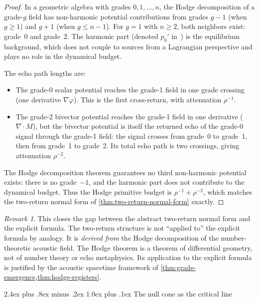 \documentclass[11pt,a4paper]{article}
\makeatletter
\theoremstyle{plain}
\theoremstyle{definition}
\theoremstyle{remark}
\newtheorem{remark}[theorem]{Remark}
\numberwithin{equation}{section}
\renewcommand{\subsection}{%
  \@startsection{subsection}{2}{0pt}%
    {2.4ex plus .8ex minus .2ex}%
    {1.0ex plus .1ex}%
    {\normalfont\Large\bfseries\color{headingAccent}}%
}
\makeatother
\begin{document}
\begin{proof}
In a geometric algebra with grades \(0,1,\ldots,n\), the Hodge
decomposition of a grade-\(g\) field has non-harmonic potential
contributions from grades \(g-1\) (when \(g\ge1\)) and \(g+1\) (when
\(g\le n-1\)).  For \(g=1\) with \(n\ge2\), both neighbors exist:
grade~0 and grade~2.  The harmonic part
(denoted \(p_0'\) in~\cite{burns2024}) is the equilibrium background, which does not
couple to sources from a Lagrangian perspective and
plays no role in the dynamical budget.

The echo path lengths are:
\begin{itemize}
  \item The grade-0 scalar potential reaches the grade-1 field in one
    grade crossing (one derivative \(\nabla\varphi\)).  This is the
    first cross-return, with attenuation \(\rho^{-1}\).
  \item The grade-2 bivector potential reaches the grade-1 field in one
    derivative (\(\nabla\cdot M\)), but the bivector potential is itself
    the returned echo of the grade-0 signal through the grade-1 field:
    the signal crosses from grade~0 to grade~1, then from grade~1 to
    grade~2.  Its total echo path is two crossings, giving attenuation
    \(\rho^{-2}\).
\end{itemize}
The Hodge decomposition theorem guarantees no third non-harmonic
potential exists: there is no grade~\(-1\), and the harmonic part does
not contribute to the dynamical budget.  Thus the Hodge primitive budget
is \(\rho^{-1}+\rho^{-2}\), which matches the two-return normal form of
\cref{thm:two-return-normal-form} exactly.
\end{proof}

\begin{remark}
This closes the gap between the abstract two-return normal form and the
explicit formula.  The two-return structure is not ``applied to'' the
explicit formula by analogy.  It is \emph{derived from} the Hodge
decomposition of the number-theoretic acoustic field.  The Hodge theorem
is a theorem of differential geometry, not of number theory or echo
metaphysics.  Its application to the explicit formula is justified by the
acoustic spacetime framework of
\cref{thm:grade-emergence,thm:hodge-registers}.
\end{remark}

\subsection{The null cone as the critical line}
\end{document}
